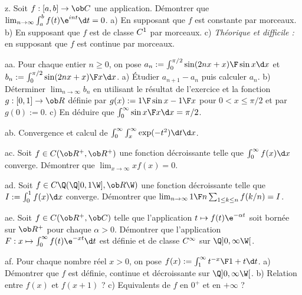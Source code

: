 \exo [Level=1,Fight=3,Learn=2,Field=\Intégration,Type=\Exercices,Origin=\MP] z. 
Soit $f:[a,b]\to\ob C$ une application. Démontrer que $\lim_{n\to\infty}\int_a^bf(t)\e^{int}\d t=0$. \pn
a) En supposant que $f$ est constante par morceaux. \pn
b) En supposant que $f$ est de classe $\sc C^1$ par morceaux. \pn
c) {\it Théorique et difficile : }en supposant que $f$ est continue par morceaux.  

\exo [Level=2,Fight=3,Learn=3,Field=\IntégralesGénéralisées,Type=\TravauxDirigés,Origin=] aa. 
Pour chaque entier $n\ge0$, on pose $a_n:=\int_0^{\pi/2}{\sin(2nx+x)\F\sin x }\d x$ et 
$b_n:=\int_0^{\pi/2}{\sin(2nx+x)\F x }\d x$. \pn
a) Étudier $a_{n+1}-a_n$ puis calculer $a_n$. \pn
b) Déterminer $\lim_{n\to\infty}b_n$ 
en utilisant le résultat de l'exercice  et la fonction $g:[0,1]\to\ob R$ 
définie par $g(x):={1\F\sin x}-{1\F x}$ pour $0<x\le \pi/2$ et par $g(0):=0$. \pn
c) En déduire que $\int_0^\infty{\sin x\F x}\d x={\pi/2}$. 

\exo [Level=2,Fight=1,Learn=1,Field=\IntégralesGénéralisées,Type=\Exercices,Origin=] ab. 
Convergence et calcul de $\int_0^\infty\int_x^\infty\exp(-t^2)\d t\d x$. 

\exo [Level=2,Fight=3,Learn=1,Field=\IntégralesGénéralisées,Type=\Colles,Origin=\MP] ac. 
Soit $f\in\sc C(\ob R^+,\ob R^+)$ une fonction décroissante telle que $\int_0^\infty f(x)\d x$ converge. \pn
Démontrer que $\lim_{x\to\infty}xf(x)=0$. 

\exo [Level=2,Fight=3,Learn=2,Field=\IntégralesGénéralisées,Type=\Colles,Origin=\MP] ad. 
Soit $f\in\sc C\Q(\Q]0,1\W],\ob R\W)$ une fonction décroissante 
telle que $I:=\int_0^1 f(x)\d x$ converge. \pn
Démontrer que $\lim_{n\to\infty}{1\F n}\sum_{1\le k\le n}f(k/n)=I$. 

\exo [Level=2,Fight=1,Learn=1,Field=\FonctionsDéfiniesParUneIntégrale,Type=\Cours,Origin=\MP] ae. 
Soit $f\in\sc C(\ob R^+,\ob C)$ telle que l'application $t\mapsto f(t)\e^{-\alpha t}$ 
soit bornée sur $\ob R^+$ pour chaque $\alpha>0$. \pn
Démontrer que l'application $F:x\mapsto\int_0^\infty f(t)\e^{-xt}\d t$ 
est définie et de classe $\sc C^\infty$ sur $\Q]0,\infty\W[$. 

\exo [Level=2,Fight=2,Learn=2,Field=\FonctionsDéfiniesParUneIntégrale,Type=\Exercices,Origin=\MP] af. 
Pour chaque nombre réel $x>0$, on pose $f(x):=\int_1^\infty{t^{-x}\F 1+t}\d t$. \pn
a) Démontrer que $f$ est définie, continue et décroissante sur $\Q]0,\infty\W[$. \pn
b) Relation entre $f(x)$ et $f(x+1)$ ? \pn
c) Equivalents de $f$ en $0^+$ et en $+\infty$ ?

